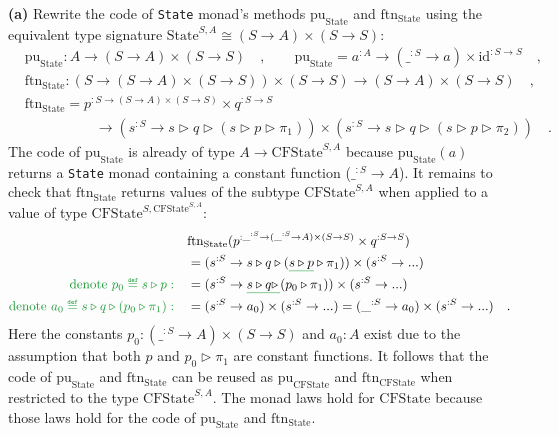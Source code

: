 \textbf{(a)} Rewrite the code of \lstinline!State! monad\textsf{'}s methods
$\text{pu}_{\text{State}}$ and $\text{ftn}_{\text{State}}$ using
the equivalent type signature $\text{State}^{S,A}\cong(S\rightarrow A)\times(S\rightarrow S)$:
\begin{align*}
 & \text{pu}_{\text{State}}:A\rightarrow(S\rightarrow A)\times(S\rightarrow S)\quad,\quad\quad\text{pu}_{\text{State}}=a^{:A}\rightarrow(\_^{:S}\rightarrow a)\times\text{id}^{:S\rightarrow S}\quad,\\
 & \text{ftn}_{\text{State}}:(S\rightarrow(S\rightarrow A)\times(S\rightarrow S))\times(S\rightarrow S)\rightarrow(S\rightarrow A)\times(S\rightarrow S)\quad,\\
 & \text{ftn}_{\text{State}}=p^{:S\rightarrow(S\rightarrow A)\times(S\rightarrow S)}\times q^{:S\rightarrow S}\\
 & \quad\quad\quad\quad\quad\rightarrow(s^{:S}\rightarrow s\triangleright q\triangleright(s\triangleright p\triangleright\pi_{1}))\times(s^{:S}\rightarrow s\triangleright q\triangleright(s\triangleright p\triangleright\pi_{2}))\quad.
\end{align*}
The code of $\text{pu}_{\text{State}}$ is already of type $A\rightarrow\text{CFState}^{S,A}$
because $\text{pu}_{\text{State}}(a)$ returns a \lstinline!State!
monad containing a constant function ($\_^{:S}\rightarrow A$). It
remains to check that $\text{ftn}_{\text{State}}$ returns values
of the subtype $\text{CFState}^{S,A}$ when applied to a value of
type $\text{CFState}^{S,\text{CFState}^{S,A}}$:
\begin{align*}
 & \text{ftn}_{\text{State}}(p^{:\_^{:S}\rightarrow(\_^{:S}\rightarrow A)\times(S\rightarrow S)}\times q^{:S\rightarrow S})\\
 & =(s^{:S}\rightarrow s\triangleright q\triangleright(\gunderline{s\triangleright p}\triangleright\pi_{1}))\times(s^{:S}\rightarrow...)\\
{\color{greenunder}\text{denote }p_{0}\triangleq s\triangleright p:}\quad & =(s^{:S}\rightarrow\gunderline{s\triangleright q\triangleright\,}(p_{0}\triangleright\pi_{1}))\times(s^{:S}\rightarrow...)\\
{\color{greenunder}\text{denote }a_{0}\triangleq s\triangleright q\triangleright(p_{0}\triangleright\pi_{1}):}\quad & =(s^{:S}\rightarrow a_{0})\times(s^{:S}\rightarrow...)=(\_^{:S}\rightarrow a_{0})\times(s^{:S}\rightarrow...)\quad.
\end{align*}
Here the constants $p_{0}:(\_^{:S}\rightarrow A)\times(S\rightarrow S)$
and $a_{0}:A$ exist due to the assumption that both $p$ and $p_{0}\triangleright\pi_{1}$
are constant functions. It follows that the code of $\text{pu}_{\text{State}}$
and $\text{ftn}_{\text{State}}$ can be reused as $\text{pu}_{\text{CFState}}$
and $\text{ftn}_{\text{CFState}}$ when restricted to the type $\text{CFState}^{S,A}$.
The monad laws hold for $\text{CFState}$ because those laws hold
for the code of $\text{pu}_{\text{State}}$ and $\text{ftn}_{\text{State}}$.

